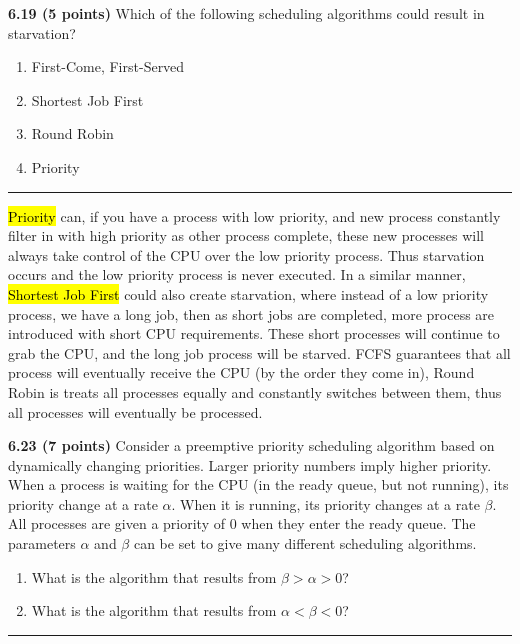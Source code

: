 \documentclass[12pt]{jhwhw}
\begin{document}
\textbf{6.19 (5 points)} 
	Which of the following scheduling algorithms could result in starvation?
	\begin{enumerate}
		\item First-Come, First-Served
		\item Shortest Job First
		\item Round Robin
		\item Priority
	\end{enumerate}
\textcolor[RGB]{240,240,240}{\rule{\textwidth}{0.5pt}}\bigbreak

	\begin{addmargin}[1em]{}
		\hl{Priority} can, if you have a process with low priority, and new process
		constantly filter in with high priority as other process complete, these
		new processes will always take control of the CPU over the low priority process.
		Thus starvation occurs and the low priority process is never executed.
		\bigbreak
		In a similar manner, \hl{Shortest Job First} could also create starvation,
		where instead of a low priority process, we have a long job, then
		as short jobs are completed, more process are introduced with short CPU
		requirements. These short processes will continue to grab the CPU, and the
		long job process will be starved.
		\bigbreak
		FCFS guarantees that all process will eventually receive the CPU (by the order
		they come in), Round Robin is treats all processes equally and constantly
		switches between them, thus all processes will eventually be processed.
	\end{addmargin}
	\bigbreak

\textbf{6.23 (7 points)} 
	Consider a preemptive priority scheduling algorithm based on dynamically
	changing priorities. Larger priority numbers imply higher priority.
	When a process is waiting for the CPU (in the ready queue, but not
	running), its priority change at a rate $\alpha$. When it is running, its
	priority changes at a rate $\beta$. All processes are given a priority of 0 when they
	enter the ready queue. The parameters $\alpha$ and $\beta$ can be set to give 
	many different scheduling algorithms.
	\begin{enumerate}
		\item What is the algorithm that results from $\beta > \alpha > 0$?
		\item What is the algorithm that results from $\alpha < \beta < 0$?
	\end{enumerate}
\textcolor[RGB]{240,240,240}{\rule{\textwidth}{0.5pt}}\bigbreak
\end{document}

